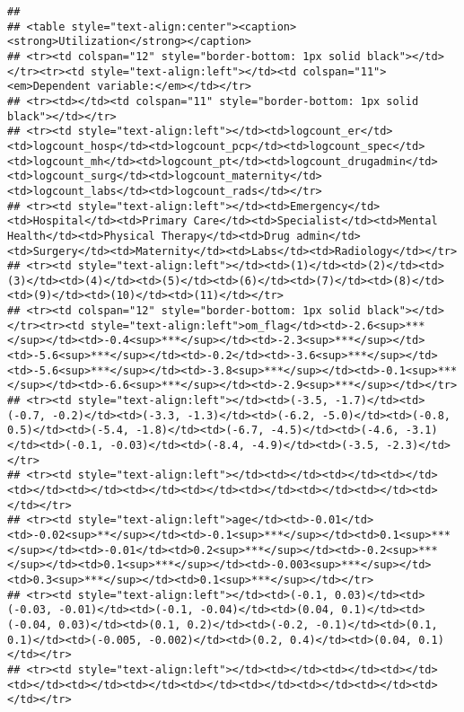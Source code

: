 \documentclass[]{article}
\begin{document}
\begin{verbatim}
## 
## <table style="text-align:center"><caption><strong>Utilization</strong></caption>
## <tr><td colspan="12" style="border-bottom: 1px solid black"></td></tr><tr><td style="text-align:left"></td><td colspan="11"><em>Dependent variable:</em></td></tr>
## <tr><td></td><td colspan="11" style="border-bottom: 1px solid black"></td></tr>
## <tr><td style="text-align:left"></td><td>logcount_er</td><td>logcount_hosp</td><td>logcount_pcp</td><td>logcount_spec</td><td>logcount_mh</td><td>logcount_pt</td><td>logcount_drugadmin</td><td>logcount_surg</td><td>logcount_maternity</td><td>logcount_labs</td><td>logcount_rads</td></tr>
## <tr><td style="text-align:left"></td><td>Emergency</td><td>Hospital</td><td>Primary Care</td><td>Specialist</td><td>Mental Health</td><td>Physical Therapy</td><td>Drug admin</td><td>Surgery</td><td>Maternity</td><td>Labs</td><td>Radiology</td></tr>
## <tr><td style="text-align:left"></td><td>(1)</td><td>(2)</td><td>(3)</td><td>(4)</td><td>(5)</td><td>(6)</td><td>(7)</td><td>(8)</td><td>(9)</td><td>(10)</td><td>(11)</td></tr>
## <tr><td colspan="12" style="border-bottom: 1px solid black"></td></tr><tr><td style="text-align:left">om_flag</td><td>-2.6<sup>***</sup></td><td>-0.4<sup>***</sup></td><td>-2.3<sup>***</sup></td><td>-5.6<sup>***</sup></td><td>-0.2</td><td>-3.6<sup>***</sup></td><td>-5.6<sup>***</sup></td><td>-3.8<sup>***</sup></td><td>-0.1<sup>***</sup></td><td>-6.6<sup>***</sup></td><td>-2.9<sup>***</sup></td></tr>
## <tr><td style="text-align:left"></td><td>(-3.5, -1.7)</td><td>(-0.7, -0.2)</td><td>(-3.3, -1.3)</td><td>(-6.2, -5.0)</td><td>(-0.8, 0.5)</td><td>(-5.4, -1.8)</td><td>(-6.7, -4.5)</td><td>(-4.6, -3.1)</td><td>(-0.1, -0.03)</td><td>(-8.4, -4.9)</td><td>(-3.5, -2.3)</td></tr>
## <tr><td style="text-align:left"></td><td></td><td></td><td></td><td></td><td></td><td></td><td></td><td></td><td></td><td></td><td></td></tr>
## <tr><td style="text-align:left">age</td><td>-0.01</td><td>-0.02<sup>**</sup></td><td>-0.1<sup>***</sup></td><td>0.1<sup>***</sup></td><td>-0.01</td><td>0.2<sup>***</sup></td><td>-0.2<sup>***</sup></td><td>0.1<sup>***</sup></td><td>-0.003<sup>***</sup></td><td>0.3<sup>***</sup></td><td>0.1<sup>***</sup></td></tr>
## <tr><td style="text-align:left"></td><td>(-0.1, 0.03)</td><td>(-0.03, -0.01)</td><td>(-0.1, -0.04)</td><td>(0.04, 0.1)</td><td>(-0.04, 0.03)</td><td>(0.1, 0.2)</td><td>(-0.2, -0.1)</td><td>(0.1, 0.1)</td><td>(-0.005, -0.002)</td><td>(0.2, 0.4)</td><td>(0.04, 0.1)</td></tr>
## <tr><td style="text-align:left"></td><td></td><td></td><td></td><td></td><td></td><td></td><td></td><td></td><td></td><td></td><td></td></tr>

\end{verbatim}
\end{document}

